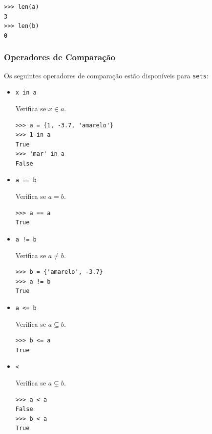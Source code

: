 \begin{lstlisting}
>>> len(a)
3
>>> len(b)
0
\end{lstlisting}

\subsubsection{Operadores de Comparação}\label{cap_lingua_sec_colecao:sssec:opcomp}

Os seguintes operadores de comparação estão disponíveis para \texttt{sets}:
\begin{itemize}
\item \lstinline+x in a+ 

  Verifica se $x\in a$.

\begin{lstlisting}[xrightmargin=2.5em]
>>> a = {1, -3.7, 'amarelo'}
>>> 1 in a
True
>>> 'mar' in a
False
\end{lstlisting}

\item \lstinline+a == b+ 

  Verifica se $a = b$.

\begin{lstlisting}[xrightmargin=2.5em]
>>> a == a
True
\end{lstlisting}

\item \lstinline+a != b+ 

  Verifica se $a \neq b$.

\begin{lstlisting}[xrightmargin=2.5em]
>>> b = {'amarelo', -3.7}
>>> a != b
True
\end{lstlisting}
  
\item \lstinline+a <= b+ 

  Verifica se $a \subseteq b$.

\begin{lstlisting}[xrightmargin=2.5em]
>>> b <= a
True
\end{lstlisting}

\item \lstinline+<+ 

  Verifica se $a\subsetneq b$.

\begin{lstlisting}[xrightmargin=2.5em]
>>> a < a
False
>>> b < a
True
\end{lstlisting}


\end{itemize}
